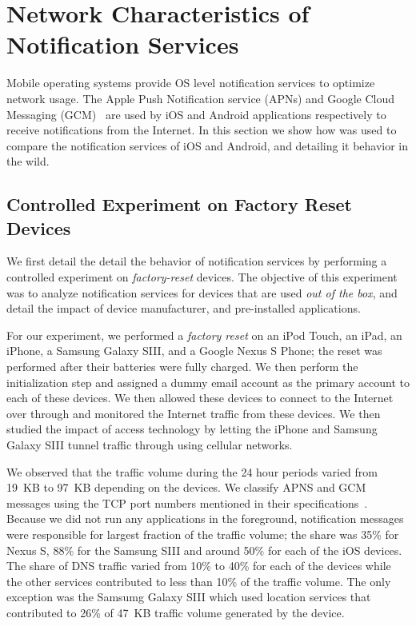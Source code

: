 \section{Network Characteristics of Notification Services}
\label{sec:characterize-os}

Mobile operating systems provide OS level notification services to optimize network usage.
The Apple Push Notification service (APNs) and Google Cloud Messaging (GCM)~\cite{gcm} are used by iOS and Android applications respectively to receive notifications from the Internet.
In this section we show how \platname was used to compare the notification services of iOS and Android, and detailing it behavior in the wild. 

\subsection{Controlled Experiment on Factory Reset Devices}

We first detail the detail the behavior of notification services by performing a controlled experiment on \emph{factory-reset} devices. 
The objective of this experiment was to analyze notification services for devices that are used \emph{out of the box}, and detail the impact of device manufacturer, and pre-installed applications. 

For our experiment, we performed a \emph{factory reset} on an iPod Touch, an iPad, an iPhone, a Samsung Galaxy SIII, and a Google Nexus S Phone; the reset was performed after their batteries were fully charged. 
We then perform the initialization step and assigned a dummy email account as the primary account to each of these devices.
We then allowed these devices to connect to the Internet over \wifi through \platname and monitored the Internet traffic from these devices.
We then studied the impact of access technology by letting the iPhone and Samsung Galaxy SIII tunnel traffic through \platname using cellular networks. 

We observed that the traffic volume during the 24 hour periods varied from 19~KB to 97~KB depending on the devices. 
We classify APNS and GCM messages using the TCP port numbers mentioned in their specifications~\cite{gcm, apns}.
Because we did not run any applications in the foreground, notification messages were responsible for largest fraction of the traffic volume; the share was 35\% for Nexus S, 88\% for the Samsung SIII and around 50\% for each of the iOS devices. 
The share of DNS traffic varied from 10\% to 40\% for each of the devices while the other services contributed to less than 10\% of the traffic volume.
The only exception was the Samsumg Galaxy SIII which used location services that contributed to 26\% of 47~KB traffic volume generated by the device.

